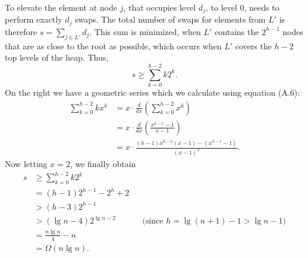 To elevate the element at node $j$, that occupies level $d_j$, to level 0,  needs to perform exactly $d_j$ swaps.
The total number of swaps for elements from $L'$ is therefore $s=\sum_{j\in L'}d_j$.
This sum is minimized, when $L'$ contains the $2^{h-1}$ nodes that are as close to the root as possible, which occurs when $L'$ covers the $h-2$ top levels of the heap.
Thus,
\[
    s \ge \sum_{k=0}^{h-2}k2^k.
\]
On the right we have a geometric series which we calculate using equation (A.6):
\begin{align*}
    \sum_{k=0}^{h-2}kx^k &= x\cdot\frac{d}{dx}\left(\sum_{k=0}^{h-2}x^k\right) \\
    &= x\cdot\frac{d}{dx}\left(\frac{x^{h-1}-1}{x-1}\right) \\
    &= x\cdot\frac{(h-1)x^{h-2}(x-1)-(x^{h-1}-1)}{(x-1)^2}.
\end{align*}
Now letting $x=2$, we finally obtain
\begin{align*}
    s &\ge \sum_{k=0}^{h-2}k2^k \\
    &= (h-1)2^{h-1}-2^h+2 \\
    &> (h-3)2^{h-1} \\
    &> (\lg n-4)2^{\lg n-2} && \text{(since $h=\lg(n+1)-1>\lg n-1$)} \\[1mm]
    &= \frac{n\lg n}{4}-n \\[1mm]
    &= \Omega(n\lg n).
\end{align*}
